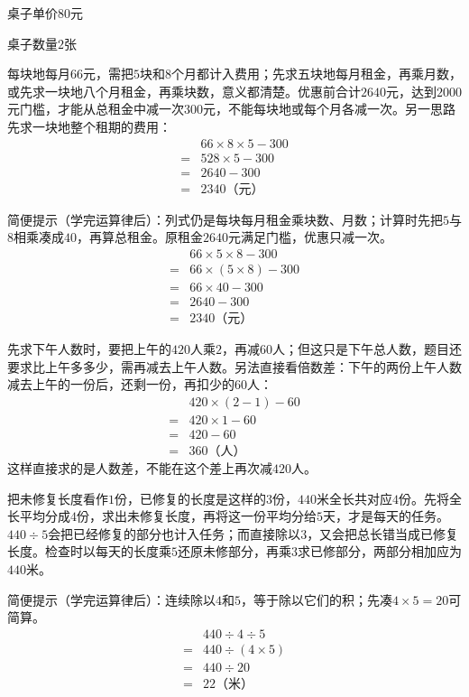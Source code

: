 \documentclass[multi=snippet,border=0pt]{standalone}
\newenvironment{snippet}[3]{\begin{minipage}{#1bp}\color{answerred}\fontsize{#2}{#3}\selectfont\raggedright}{\end{minipage}}
\begin{document}
\begin{snippet}{72.29999999999995}{8.5}{12.8}桌子单价\(80\)元\end{snippet}
\begin{snippet}{71.29999999999995}{8.5}{12.8}桌子数量\(2\)张\end{snippet}
\begin{snippet}{505}{11.5}{14}每块地每月\(66\)元，需把\(5\)块和\(8\)个月都计入费用；先求五块地每月租金，再乘月数，或先求一块地八个月租金，再乘块数，意义都清楚。优惠前合计\(2640\)元，达到\(2000\)元门槛，才能从总租金中减一次\(300\)元，不能每块地或每个月各减一次。另一思路先求一块地整个租期的费用：\[\begin{aligned}&66\times8\times5-300\\={}&528\times5-300\\={}&2640-300\\={}&2340\text{（元）}\end{aligned}\]\par 简便提示（学完运算律后）：列式仍是每块每月租金乘块数、月数；计算时先把\(5\)与\(8\)相乘凑成\(40\)，再算总租金。原租金\(2640\)元满足门槛，优惠只减一次。\[\begin{aligned}&66\times5\times8-300\\={}&66\times(5\times8)-300\\={}&66\times40-300\\={}&2640-300\\={}&2340\text{（元）}\end{aligned}\]\end{snippet}
\begin{snippet}{505}{11.5}{14}先求下午人数时，要把上午的\(420\)人乘\(2\)，再减\(60\)人；但这只是下午总人数，题目还要求比上午多多少，需再减去上午人数。另法直接看倍数差：下午的两份上午人数减去上午的一份后，还剩一份，再扣少的\(60\)人：\[\begin{aligned}&420\times(2-1)-60\\={}&420\times1-60\\={}&420-60\\={}&360\text{（人）}\end{aligned}\]这样直接求的是人数差，不能在这个差上再次减\(420\)人。\end{snippet}
\begin{snippet}{505}{11.5}{14}把未修复长度看作\(1\)份，已修复的长度是这样的\(3\)份，\(440\)米全长共对应\(4\)份。先将全长平均分成\(4\)份，求出未修复长度，再将这一份平均分给\(5\)天，才是每天的任务。\(440\div5\)会把已经修复的部分也计入任务；而直接除以\(3\)，又会把总长错当成已修复长度。检查时以每天的长度乘\(5\)还原未修部分，再乘\(3\)求已修部分，两部分相加应为\(440\)米。\par 简便提示（学完运算律后）：连续除以\(4\)和\(5\)，等于除以它们的积；先凑\(4\times5=20\)可简算。\[\begin{aligned}&440\div4\div5\\={}&440\div(4\times5)\\={}&440\div20\\={}&22\text{（米）}\end{aligned}\]\end{snippet}
\end{document}

